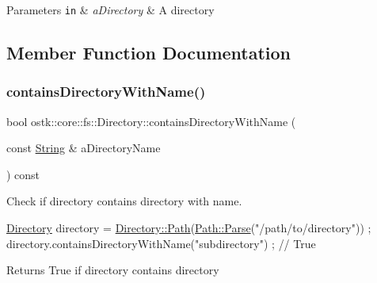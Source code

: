 \begin{DoxyParams}[1]{Parameters}
\mbox{\tt in}  & {\em a\+Directory} & A directory \\
\hline
\end{DoxyParams}


\subsection{Member Function Documentation}
\mbox{\label{classostk_1_1core_1_1fs_1_1_directory_aac35798f8765060ddd76cfdcce5d312b}} 
\subsubsection{\texorpdfstring{contains\+Directory\+With\+Name()}{containsDirectoryWithName()}}
{\footnotesize\ttfamily bool ostk\+::core\+::fs\+::\+Directory\+::contains\+Directory\+With\+Name (\begin{DoxyParamCaption}\item[{const \hyperlink{classostk_1_1core_1_1types_1_1_string}{String} \&}]{a\+Directory\+Name }\end{DoxyParamCaption}) const}



Check if directory contains directory with name. 


\begin{DoxyCode}
\hyperlink{classostk_1_1core_1_1fs_1_1_directory_adc893e10f55282be0d0455e9cfc5796b}{Directory} directory = \hyperlink{classostk_1_1core_1_1fs_1_1_directory_a0151dba2940d5f426b52209dc7dab2e5}{Directory::Path}(\hyperlink{classostk_1_1core_1_1fs_1_1_path_ad08539ba654f5df11c4bcb07276345ad}{Path::Parse}(\textcolor{stringliteral}{"/path/to/directory"}))
       ;
directory.containsDirectoryWithName(\textcolor{stringliteral}{"subdirectory"}) ; \textcolor{comment}{// True}
\end{DoxyCode}


\begin{DoxyReturn}{Returns}
True if directory contains directory 
\end{DoxyReturn}
\mbox{\label{classostk_1_1core_1_1fs_1_1_directory_ada98ea55cb05fb3297bb318420caed67}} 
